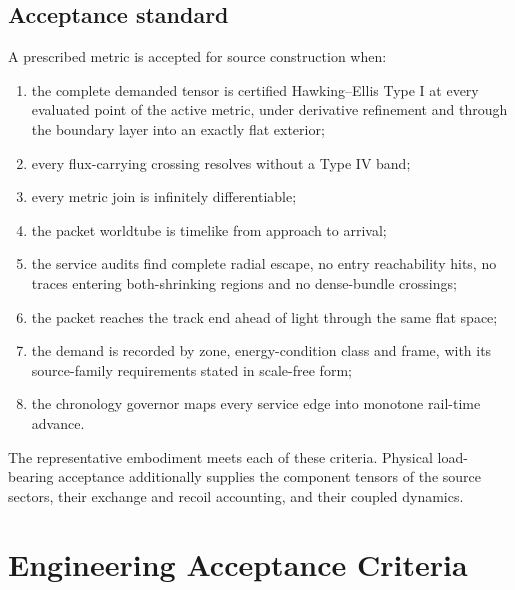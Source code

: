 \documentclass[11pt]{article}
\begin{document}
\subsection{Acceptance standard}

A prescribed metric is accepted for source construction when:
\begin{enumerate}
\item the complete demanded tensor is certified Hawking--Ellis Type I at every evaluated point of the active metric, under derivative refinement and through the boundary layer into an exactly flat exterior;
\item every flux-carrying crossing resolves without a Type IV band;
\item every metric join is infinitely differentiable;
\item the packet worldtube is timelike from approach to arrival;
\item the service audits find complete radial escape, no entry reachability hits, no traces entering both-shrinking regions and no dense-bundle crossings;
\item the packet reaches the track end ahead of light through the same flat space;
\item the demand is recorded by zone, energy-condition class and frame, with its source-family requirements stated in scale-free form;
\item the chronology governor maps every service edge into monotone rail-time advance.
\end{enumerate}
The representative embodiment meets each of these criteria. Physical load-bearing acceptance additionally supplies the component tensors of the source sectors, their exchange and recoil accounting, and their coupled dynamics.

\section{Engineering Acceptance Criteria}
\end{document}
